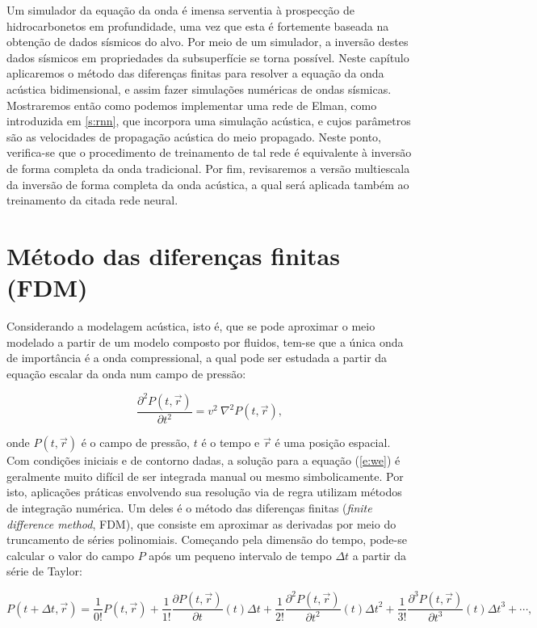   Um simulador da equação da onda é imensa serventia à prospecção de hidrocarbonetos em profundidade, uma vez que esta é fortemente baseada na obtenção de dados sísmicos do alvo. Por meio de um simulador, a inversão destes dados sísmicos em propriedades da subsuperfície se torna possível. Neste capítulo aplicaremos o método das diferenças finitas para resolver a equação da onda acústica bidimensional, e assim fazer simulações numéricas de ondas sísmicas. Mostraremos então como podemos implementar uma rede de Elman, como introduzida em \ref{s:rnn}, que incorpora uma simulação acústica, e cujos parâmetros são as velocidades de propagação acústica do meio propagado. Neste ponto, verifica-se que o procedimento de treinamento de tal rede é equivalente à inversão de forma completa da onda tradicional. Por fim, revisaremos a versão multiescala da inversão de forma completa da onda acústica, a qual será aplicada também ao treinamento da citada rede neural.

  \section{Método das diferenças finitas (FDM)}  \label{s:fdm}

    Considerando a modelagem acústica, isto é, que se pode aproximar o meio modelado a partir de um modelo composto por fluidos, tem-se que a única onda de importância é a onda compressional, a qual pode ser estudada a partir da equação escalar da onda num campo de pressão:

    \begin{equation} \label{e:we}
      \frac{\partial^2 P(t,\vec{r})}{\partial t^2} = v^2\ \nabla^2 P(t,\vec{r})
      ,
    \end{equation}

    \noindent onde $P(t,\vec{r})$ é o campo de pressão, $t$ é o tempo e $\vec{r}$ é uma posição espacial. Com condições iniciais e de contorno dadas, a solução para a equação (\ref{e:we}) é geralmente muito difícil de ser integrada manual ou mesmo simbolicamente. Por isto, aplicações práticas envolvendo sua resolução via de regra utilizam métodos de integração numérica. Um deles é o método das diferenças finitas (\textit{finite difference method}, FDM), que consiste em aproximar as derivadas por meio do truncamento de séries polinomiais. Começando pela dimensão do tempo, pode-se calcular o valor do campo $P$ após um pequeno intervalo de tempo $\Delta t$ a partir da série de Taylor:

    \begin{equation} \label{e:serie_p_depois_de_dt}
      P(t+{\Delta t}, \vec{r}) =
        \frac{1}{0!} P(t, \vec{r})
        + \frac{1}{1!} \frac{\partial P(t, \vec{r})}{\partial t}(t) {\Delta t}
        + \frac{1}{2!} \frac{\partial^2 P(t, \vec{r})}{\partial t^2}(t) {\Delta t}^2
        + \frac{1}{3!} \frac{\partial^3 P(t, \vec{r})}{\partial t^3}(t) {\Delta t}^3
        + \cdots
        ,
    \end{equation}

